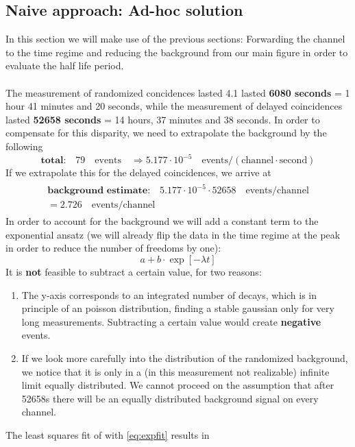 \subsection{Naive approach: Ad-hoc solution}
In this section we will make use of the previous sections: Forwarding the channel to the time regime and
reducing the background from our main figure in order to evaluate the half life period.\\\\
The measurement of randomized concidences lasted 4.1 lasted \textbf{6080 seconds} = 1 hour 41 minutes and 20 seconds, while
the measurement of delayed coincidences lasted \textbf{52658 seconds} =  14 hours, 37 minutes and 38 seconds. 
In order to compensate for this disparity, we need to extrapolate the background by the following
\begin{equation}
\mathrm{\textbf{total:} } \quad 79 \quad \mathrm{events} \quad \Rightarrow 5.177\cdot 10^{-5}\quad \mathrm{events/ (channel \cdot second)}
\end{equation}
If we extrapolate this for the delayed coincidences, we arrive at
\begin{align}
\begin{split}
\mathrm{\textbf{background estimate:} } \quad  5.177\cdot 10^{-5} \cdot 52658 \quad \mathrm{events / channel} \\
= 2.726\quad \mathrm{events/ channel}
\end{split}
\end{align}
In order to account for the background we will add a constant term to the exponential ansatz (we will already
flip the data in the time regime at the peak in order to reduce the number of freedoms by one):
\begin{equation}
\label{eq:expfit}
a + b\cdot \exp \left [ - \lambda t \right ] 
\end{equation}
It is \textbf{not} feasible to subtract a certain value, for two reasons:
\begin{enumerate}
\item The y-axis corresponds to an integrated number of decays, which is in principle of an poisson distribution,
finding a stable gaussian only for very long measurements. Subtracting a certain value would create \textbf{negative}
events. 
\item If we look more carefully into the distribution of the randomized background, we notice that it is only
in a (in this measurement not realizable) infinite limit equally distributed. We cannot proceed on the assumption
that after 52658s there will be an equally distributed background signal on every channel.
\end{enumerate}
The least squares fit of with \eqref{eq:expfit} results in 

